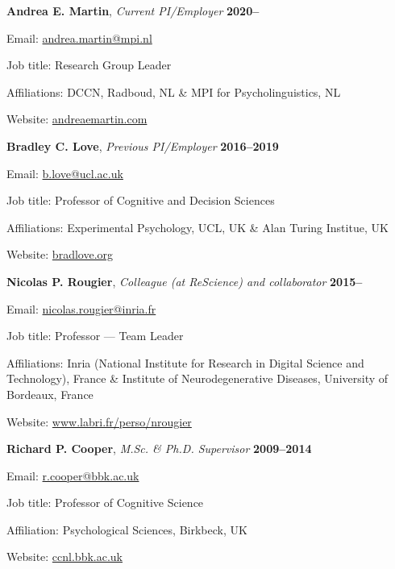 \documentclass[10pt]{article}
\newenvironment{outerlist}[1][\enskip\textbullet]%
        {\begin{itemize}[#1]}{\end{itemize}%
         \vspace{-.6\baselineskip}}
\newenvironment{innerlist}[1][\enskip\textbullet]%
        {\begin{compactitem}[#1]}{\end{compactitem}}
\begin{document}
\begin{outerlist}
\item[\textbf{Andrea E. Martin},] \emph{Current PI/Employer}   \hfill \textbf{2020--}
\begin{innerlist}
    \item Email: \href{mailto:Andrea.Martin@mpi.nl}{andrea.martin@mpi.nl}
    \item Job title: Research Group Leader
    \item {Affiliations:} DCCN, Radboud, NL \& MPI for Psycholinguistics, NL
    \item Website: \href{http://andreaemartin.com/}{andreaemartin.com}
\end{innerlist}


\item[\textbf{Bradley C. Love},] \emph{Previous PI/Employer}   \hfill \textbf{2016--2019}
\begin{innerlist}
    \item Email: \href{mailto:b.love@ucl.ac.uk}{b.love@ucl.ac.uk}
    \item Job title: Professor of Cognitive and Decision Sciences 
    \item {Affiliations:} Experimental Psychology, UCL, UK \& Alan Turing Institue, UK
    \item Website: \href{http://bradlove.org/}{bradlove.org}
\end{innerlist}

\item[\textbf{Nicolas P. Rougier},] \emph{Colleague (at ReScience) and collaborator}   \hfill \textbf{2015--}
\begin{innerlist}
    \item Email: \href{mailto:Nicolas.Rougier@inria.fr }{nicolas.rougier@inria.fr}
    \item Job title: Professor --- Team Leader
    \item {Affiliations:} Inria (National Institute for Research in Digital Science and Technology), France \& Institute of Neurodegenerative Diseases, University of Bordeaux, France
    \item Website: \href{https://www.labri.fr/perso/nrougier/}{www.labri.fr/perso/nrougier}
\end{innerlist}


\item[\textbf{Richard P. Cooper},] \emph{M.Sc. \& Ph.D. Supervisor}   \hfill \textbf{2009--2014}
\begin{innerlist}
    \item Email: \href{mailto:r.cooper@bbk.ac.uk}{r.cooper@bbk.ac.uk}
    \item Job title: Professor of Cognitive Science 
    \item {Affiliation:} Psychological Sciences, Birkbeck, UK
    \item Website: \href{http://ccnl.bbk.ac.uk/}{ccnl.bbk.ac.uk}
\end{innerlist}



\end{outerlist}
\end{document}
